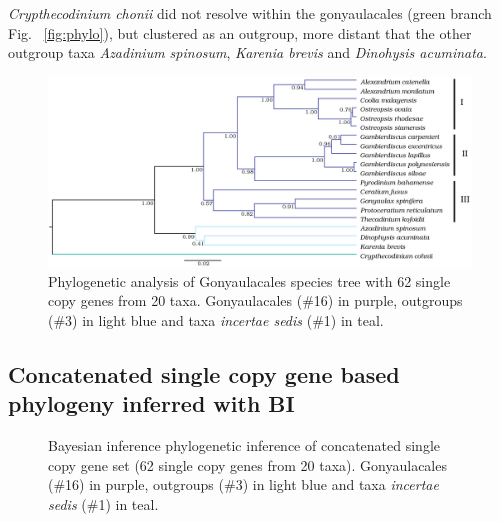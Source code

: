 \documentclass[12pt]{article}
\begin{document}
\emph{Crypthecodinium chonii} did not resolve within the gonyaulacales (green branch Fig. ~\ref{fig:phylo}), but clustered as an outgroup, more distant that the other outgroup taxa \emph{Azadinium spinosum}, \emph{Karenia brevis} and \emph{Dinohysis acuminata}.
\FloatBarrier 
\begin{figure} 
\includegraphics[scale=.25]{Aug2_20-taxa-combined-fig_MCC_trees_gimp.png} 
\caption{Phylogenetic analysis of Gonyaulacales species tree with 62 single copy genes from 20 taxa. Gonyaulacales (\#16) in purple, outgroups (\#3) in light blue and taxa \textit{incertae sedis} (\#1) in teal.} 
\label{fig:SCmscBI}
\end{figure} 
\FloatBarrier

\subsection*{Concatenated single copy gene based phylogeny inferred with BI}
\FloatBarrier 
\begin{figure} 
\caption{Bayesian inference phylogenetic inference of concatenated single copy gene set (62 single copy genes from 20 taxa). Gonyaulacales (\#16) in purple, outgroups (\#3) in light blue and taxa \textit{incertae sedis} (\#1) in teal.} 
\label{fig:SCconcatBI}
\end{figure} 
\FloatBarrier
\end{document}
